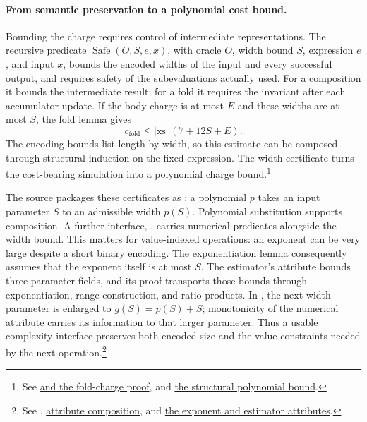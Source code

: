 \paragraph{From semantic preservation to a polynomial cost bound.}
Bounding the charge requires control of intermediate representations. The recursive
predicate $\operatorname{Safe}(O,S,e,x)$, with oracle $O$, width bound
$S$, expression $e$, and input $x$, bounds the encoded widths of the input and
every successful output, and requires safety of the subevaluations actually
used. For a composition it bounds the intermediate result; for a fold it
requires the invariant after each accumulator update. If the body charge
is at most $E$ and these widths are at most $S$, the fold lemma gives
\[
  c_{\mathrm{fold}}\leq |\mathrm{xs}|\,(7+12S+E).
\]
The encoding bounds list length by width, so this estimate can be composed
through structural induction on the fixed expression. The width
certificate turns the cost-bearing simulation into a polynomial charge
bound.\footnote{See
\href{https://github.com/openai/math/blob/fd4aeeb2ee4fc729c18d98444fed42fd0529eeeb/lean/OAI/Combinatorics/MatroidCounting/CommonBases.lean\#L16855-L16904}{ and the fold-charge proof}, and
\href{https://github.com/openai/math/blob/fd4aeeb2ee4fc729c18d98444fed42fd0529eeeb/lean/OAI/Combinatorics/MatroidCounting/CommonBases.lean\#L17079-L17092}{the structural polynomial bound}.}

The source packages these certificates as : a polynomial
$p$ takes an input parameter $S$ to an admissible width $p(S)$.
Polynomial substitution supports composition. A further interface,
, carries numerical predicates alongside the width bound.
This matters for value-indexed operations: an exponent can be very large
despite a short binary encoding. The exponentiation lemma consequently
assumes that the exponent itself is at most $S$. The estimator's attribute
bounds three parameter fields, and its proof transports those bounds
through exponentiation, range construction, and ratio products.
In , the next width parameter is enlarged to
$g(S)=p(S)+S$; monotonicity of the numerical attribute carries its
information to that larger parameter. Thus a usable complexity interface
preserves both encoded size and the value constraints needed by the next
operation.\footnote{See
\href{https://github.com/openai/math/blob/fd4aeeb2ee4fc729c18d98444fed42fd0529eeeb/lean/OAI/Combinatorics/MatroidCounting/CommonBases.lean\#L17689-L17706}{},
\href{https://github.com/openai/math/blob/fd4aeeb2ee4fc729c18d98444fed42fd0529eeeb/lean/OAI/Combinatorics/MatroidCounting/CommonBases.lean\#L22444-L22466}{attribute composition}, and
\href{https://github.com/openai/math/blob/fd4aeeb2ee4fc729c18d98444fed42fd0529eeeb/lean/OAI/Combinatorics/MatroidCounting/CommonBases.lean\#L24280-L24308}{the exponent and estimator attributes}.}

